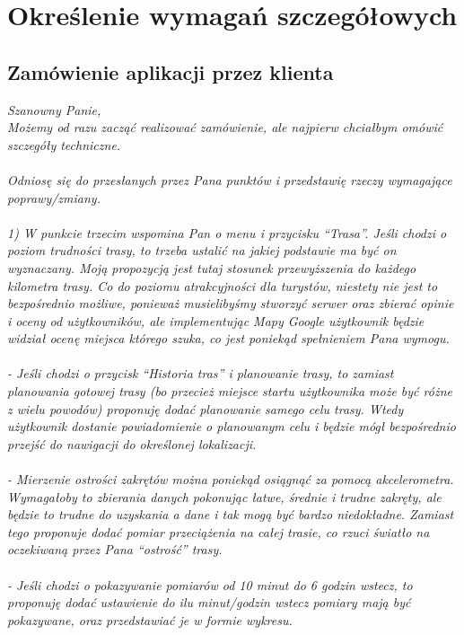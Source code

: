 	\newpage
\section{Określenie wymagań szczegółowych}		%
\subsection{Zamówienie aplikacji przez klienta}  %

\hspace{1cm}
\textit{
Szanowny Panie,\\
Możemy od razu zacząć realizować zamówienie, ale najpierw chciałbym omówić szczegóły techniczne. \\\\
Odniosę się do przesłanych przez Pana punktów i przedstawię rzeczy wymagające poprawy/zmiany.\\\\
1) W punkcie trzecim wspomina Pan o menu i przycisku ``Trasa''. Jeśli chodzi o poziom trudności trasy, to trzeba ustalić na jakiej podstawie ma być on wyznaczany. Moją propozycją jest tutaj stosunek przewyższenia do każdego kilometra trasy. Co do poziomu atrakcyjności dla turystów, niestety nie jest to bezpośrednio możliwe, ponieważ musielibyśmy stworzyć serwer oraz zbierać opinie i oceny od użytkowników, ale implementując Mapy Google użytkownik będzie widział ocenę miejsca którego szuka, co jest poniekąd spełnieniem Pana wymogu. \\\\
- Jeśli chodzi o przycisk ``Historia tras'' i planowanie trasy, to zamiast planowania gotowej trasy (bo przecież miejsce startu użytkownika może być różne z wielu powodów) proponuję dodać planowanie samego celu trasy. Wtedy użytkownik dostanie powiadomienie o planowanym celu i będzie mógł bezpośrednio przejść do nawigacji do określonej lokalizacji. \\\\
- Mierzenie ostrości zakrętów można poniekąd osiągnąć za pomocą akcelerometra. Wymagałoby to zbierania danych pokonując łatwe, średnie i trudne zakręty, ale będzie to trudne do uzyskania a dane i tak mogą być bardzo niedokładne. Zamiast tego proponuje dodać pomiar przeciążenia na całej trasie, co rzuci światło na oczekiwaną przez Pana ``ostrość'' trasy. \\\\
- Jeśli chodzi o pokazywanie pomiarów od 10 minut do 6 godzin wstecz, to proponuję dodać ustawienie do ilu minut/godzin wstecz pomiary mają być pokazywane, oraz przedstawiać je w formie wykresu. \\\\
}
